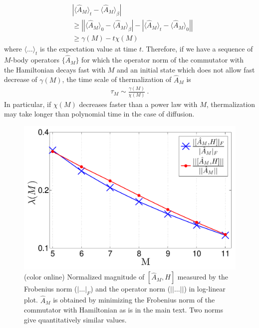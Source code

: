 \documentclass[twocolumn,superscriptaddress, prb]{revtex4-1}
\begin{document}
\begin{align}
&|\langle \hat{A}_M \rangle_t - \langle \hat{A}_M \rangle_\beta| \nonumber\\
&\geq \left | |\langle \hat{A}_M\rangle_0 - \langle \hat{A}_M\rangle_\beta | -|\langle \hat{A}_M\rangle_t - \langle \hat{A}_M\rangle_0 |\right | \nonumber\\
&\geq \gamma(M) - t \chi(M)
\end{align}
where $\langle \ldots \rangle_t$ is the expectation value at time $t$.
Therefore, if we have a sequence of $M$-body operators $\{ \hat{A}_M \}$
for which the operator norm of the commutator with the Hamiltonian decays fast with $M$
and an initial state which does not allow fast decrease of $\gamma(M)$,
the time scale of thermalization of $\hat{A}_M$ is
\begin{align}
\tau_M \sim \frac{\gamma(M)}{\chi(M)} ~.
\end{align}
In particular, if $\chi(M)$ decreases faster than a power law with $M$,
thermalization may take longer than polynomial time in the case of diffusion.



\begin{figure}
\includegraphics[width=1.0\linewidth]{infinite_ham_opnorm.pdf}
\centering
\caption{(color online) Normalized magnitude of $[\hat{A}_M, H]$ measured by the Frobenius norm ($|\ldots|_F$) and the operator norm ($||\ldots||$)
in log-linear plot.
$\hat{A}_M$ is obtained by minimizing the Frobenius norm of the commutator with Hamiltonian as is in the main text.
Two norms give quantitatively similar values.
}
\label{fig:op_norm}
\end{figure}
\end{document}
